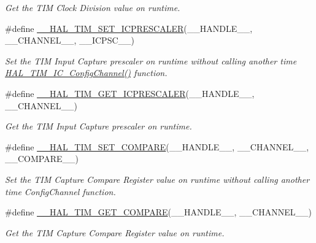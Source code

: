 \begin{DoxyCompactItemize}
\begin{DoxyCompactList}\small\item\em Get the T\+IM Clock Division value on runtime. \end{DoxyCompactList}\item 
\#define \hyperlink{group___t_i_m___exported___macros_gaeb106399b95ef02cec502f58276a0e92}{\+\_\+\+\_\+\+H\+A\+L\+\_\+\+T\+I\+M\+\_\+\+S\+E\+T\+\_\+\+I\+C\+P\+R\+E\+S\+C\+A\+L\+ER}(\+\_\+\+\_\+\+H\+A\+N\+D\+L\+E\+\_\+\+\_\+,  \+\_\+\+\_\+\+C\+H\+A\+N\+N\+E\+L\+\_\+\+\_\+,  \+\_\+\+\_\+\+I\+C\+P\+S\+C\+\_\+\+\_\+)
\begin{DoxyCompactList}\small\item\em Set the T\+IM Input Capture prescaler on runtime without calling another time \hyperlink{group___t_i_m___exported___functions___group8_ga34805dabaf748c6eb823275dad2f19f5}{H\+A\+L\+\_\+\+T\+I\+M\+\_\+\+I\+C\+\_\+\+Config\+Channel()} function. \end{DoxyCompactList}\item 
\#define \hyperlink{group___t_i_m___exported___macros_gabfeec6b3c67a5747c7dbd20aff61d8e2}{\+\_\+\+\_\+\+H\+A\+L\+\_\+\+T\+I\+M\+\_\+\+G\+E\+T\+\_\+\+I\+C\+P\+R\+E\+S\+C\+A\+L\+ER}(\+\_\+\+\_\+\+H\+A\+N\+D\+L\+E\+\_\+\+\_\+,  \+\_\+\+\_\+\+C\+H\+A\+N\+N\+E\+L\+\_\+\+\_\+)
\begin{DoxyCompactList}\small\item\em Get the T\+IM Input Capture prescaler on runtime. \end{DoxyCompactList}\item 
\#define \hyperlink{group___t_i_m___exported___macros_ga300d0c9624c3b072d3afeb7cef639b66}{\+\_\+\+\_\+\+H\+A\+L\+\_\+\+T\+I\+M\+\_\+\+S\+E\+T\+\_\+\+C\+O\+M\+P\+A\+RE}(\+\_\+\+\_\+\+H\+A\+N\+D\+L\+E\+\_\+\+\_\+,  \+\_\+\+\_\+\+C\+H\+A\+N\+N\+E\+L\+\_\+\+\_\+,  \+\_\+\+\_\+\+C\+O\+M\+P\+A\+R\+E\+\_\+\+\_\+)
\begin{DoxyCompactList}\small\item\em Set the T\+IM Capture Compare Register value on runtime without calling another time Config\+Channel function. \end{DoxyCompactList}\item 
\#define \hyperlink{group___t_i_m___exported___macros_gaa40722f56910966e1da5241b610eed84}{\+\_\+\+\_\+\+H\+A\+L\+\_\+\+T\+I\+M\+\_\+\+G\+E\+T\+\_\+\+C\+O\+M\+P\+A\+RE}(\+\_\+\+\_\+\+H\+A\+N\+D\+L\+E\+\_\+\+\_\+,  \+\_\+\+\_\+\+C\+H\+A\+N\+N\+E\+L\+\_\+\+\_\+)
\begin{DoxyCompactList}\small\item\em Get the T\+IM Capture Compare Register value on runtime. \end{DoxyCompactList}\item 

\end{DoxyCompactItemize}
